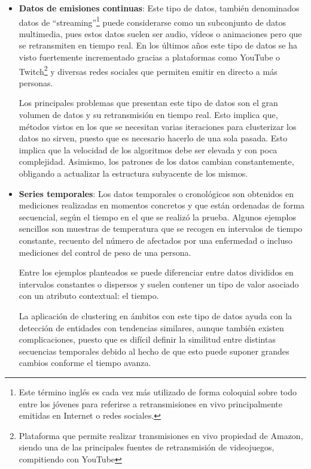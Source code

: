 \documentclass[10pt, a4paper]{article}
\begin{document}
\begin{itemize}
  \item \textbf{Datos de emisiones continuas}: Este tipo de datos, también denominados datos de ``streaming''\footnote{Este término inglés es cada vez más utilizado de forma coloquial sobre todo entre los jóvenes para referirse a retransmisiones en vivo principalmente emitidas en Internet o redes sociales.} puede considerarse como un subconjunto de datos multimedia, pues estos datos suelen ser audio, vídeos o animaciones pero que se retransmiten en tiempo real. En los últimos años este tipo de datos se ha visto fuertemente incrementado gracias a plataformas como YouTube o Twitch\footnote{Plataforma que permite realizar transmisiones en vivo propiedad de Amazon, siendo una de las principales fuentes de retransmisión de videojuegos, compitiendo con YouTube} y diversas redes sociales que permiten emitir en directo a más personas.
  
  Los principales problemas que presentan este tipo de datos son el gran volumen de datos y su retransmisión en tiempo real. Esto implica que, métodos vistos en los que se necesitan varias iteraciones para clusterizar los datos no sirven, puesto que es necesario hacerlo de una sola pasada. Esto implica que la velocidad de los algoritmos debe ser elevada y con poca complejidad. Asimismo, los patrones de los datos cambian constantemente, obligando a actualizar la estructura subyacente de los mismos.
  
  \item \textbf{Series temporales}: Los datos temporales o cronológicos son obtenidos en mediciones realizadas en momentos concretos y que están ordenadas de forma secuencial, según el tiempo en el que se realizó la prueba. Algunos ejemplos sencillos son muestras de temperatura que se recogen en intervalos de tiempo constante, recuento del número de afectados por una enfermedad o incluso mediciones del control de peso de una persona.
  
  Entre los ejemplos planteados se puede diferenciar entre datos divididos en intervalos constantes o dispersos y suelen contener un tipo de valor asociado con un atributo contextual: el tiempo.
  
  La aplicación de clustering en ámbitos con este tipo de datos ayuda con la detección de entidades con tendencias similares, aunque también existen complicaciones, puesto que es difícil definir la similitud entre distintas secuencias temporales debido al hecho de que esto puede suponer grandes cambios conforme el tiempo avanza.
  

\end{itemize}
\end{document}
